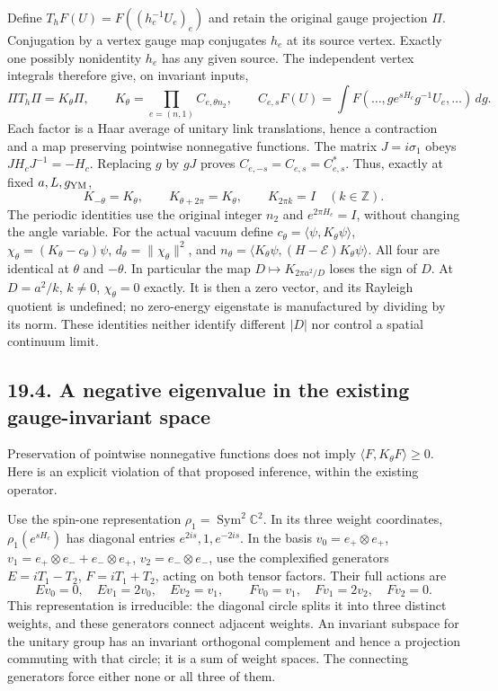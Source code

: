 \documentclass[
]{article}
\begin{document}
Define \(T_hF(U)=F((h_e^{-1}U_e)_e)\) and retain the original gauge
projection \(\Pi\). Conjugation by a vertex gauge map conjugates \(h_e\)
at its source vertex. Exactly one possibly nonidentity \(h_e\) has any
given source. The independent vertex integrals therefore give, on
invariant inputs, \[
\Pi T_h\Pi=K_\theta\Pi,\qquad
K_\theta=\prod_{e=(n,1)}C_{e,\theta n_2},\qquad
C_{e,s}F(U)=\int F(\ldots,g e^{sH_c}g^{-1}U_e,\ldots)\,dg.
                                                               \tag{19.14}
\] Each factor is a Haar average of unitary link translations, hence a
contraction and a map preserving pointwise nonnegative functions. The
matrix \(J=i\sigma_1\) obeys \(JH_cJ^{-1}=-H_c\). Replacing \(g\) by
\(gJ\) proves \(C_{e,-s}=C_{e,s}=C_{e,s}^*\). Thus, exactly at fixed
\(a,L,g_{\rm YM}\), \[
K_{-\theta}=K_\theta,\qquad
K_{\theta+2\pi}=K_\theta,\qquad K_{2\pi k}=I\quad(k\in\mathbb Z).
                                                               \tag{19.15}
\] The periodic identities use the original integer \(n_2\) and
\(e^{2\pi H_c}=I\), without changing the angle variable. For the actual
vacuum define \(c_\theta=\langle\psi,K_\theta\psi\rangle\),
\(\chi_\theta=(K_\theta-c_\theta)\psi\), \(d_\theta=\|\chi_\theta\|^2\),
and \(n_\theta=\langle K_\theta\psi,(H-\mathcal E)K_\theta\psi\rangle\).
All four are identical at \(\theta\) and \(-\theta\). In particular the
map \(D\mapsto K_{2\pi a^2/D}\) loses the sign of \(D\). At \(D=a^2/k\),
\(k\ne0\), \(\chi_\theta=0\) exactly. It is then a zero vector, and its
Rayleigh quotient is undefined; no zero-energy eigenstate is
manufactured by dividing by its norm. These identities neither identify
different \(|D|\) nor control a spatial continuum limit.

\subsection{19.4. A negative eigenvalue in the existing gauge-invariant
space}\label{a-negative-eigenvalue-in-the-existing-gauge-invariant-space}

Preservation of pointwise nonnegative functions does not imply
\(\langle F,K_\theta F\rangle\ge0\). Here is an explicit violation of
that proposed inference, within the existing operator.

Use the spin-one representation
\(\rho_1=\operatorname{Sym}^2\mathbb C^2\). In its three weight
coordinates, \(\rho_1(e^{sH_c})\) has diagonal entries
\(e^{2is},1,e^{-2is}\). In the basis \(v_0=e_+\otimes e_+\),
\(v_1=e_+\otimes e_-+e_-\otimes e_+\), \(v_2=e_-\otimes e_-\), use the
complexified generators \(E=iT_1-T_2\), \(F=iT_1+T_2\), acting on both
tensor factors. Their full actions are \[
Ev_0=0,\quad Ev_1=2v_0,\quad Ev_2=v_1,\qquad
Fv_0=v_1,\quad Fv_1=2v_2,\quad Fv_2=0.
\] This representation is irreducible: the diagonal circle splits it
into three distinct weights, and these generators connect adjacent
weights. An invariant subspace for the unitary group has an invariant
orthogonal complement and hence a projection commuting with that circle;
it is a sum of weight spaces. The connecting generators force either
none or all three of them.
\end{document}
